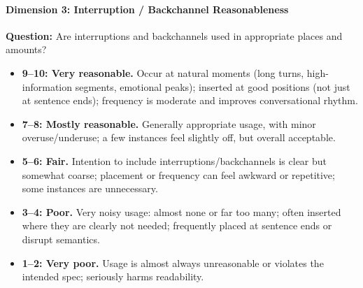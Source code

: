 \paragraph{Dimension 3: Interruption / Backchannel Reasonableness}
\textbf{Question:} Are interruptions and backchannels used in appropriate places and amounts?
\begin{itemize}
  \item \textbf{9--10: Very reasonable.}
  Occur at natural moments (long turns, high-information segments, emotional peaks);
  inserted at good positions (not just at sentence ends);
  frequency is moderate and improves conversational rhythm.

  \item \textbf{7--8: Mostly reasonable.}
  Generally appropriate usage, with minor overuse/underuse;
  a few instances feel slightly off, but overall acceptable.

  \item \textbf{5--6: Fair.}
  Intention to include interruptions/backchannels is clear but somewhat coarse;
  placement or frequency can feel awkward or repetitive;
  some instances are unnecessary.

  \item \textbf{3--4: Poor.}
  Very noisy usage: almost none or far too many;
  often inserted where they are clearly not needed;
  frequently placed at sentence ends or disrupt semantics.

  \item \textbf{1--2: Very poor.}
  Usage is almost always unreasonable or violates the intended spec;
  seriously harms readability.
\end{itemize}

